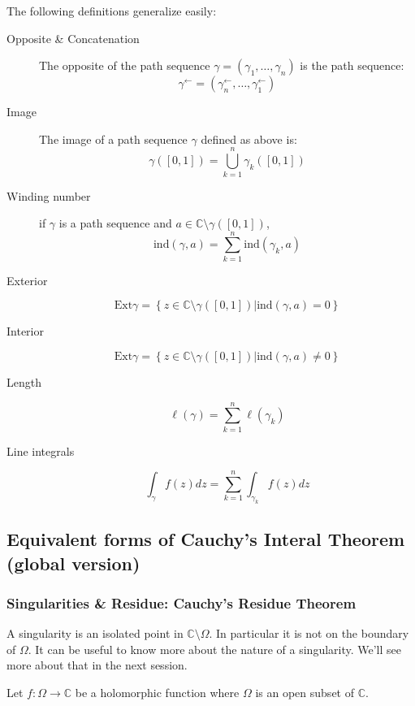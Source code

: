 \begin{enumerate}
\begin{defi}
    The following definitions generalize easily:

    \begin{description}
        \item[Opposite \& Concatenation] The opposite of the path sequence $\gamma = (\gamma_1, \dots, \gamma_n)$ is the path sequence:
            $$\gamma^\leftarrow  = (\gamma_n^\leftarrow, \dots, \gamma_1^\leftarrow)$$
        \item[Image] The image of a path sequence $\gamma$ defined as above is:
            $$ \gamma([0,1]) = \bigcup_{k=1}^n{\gamma_k([0,1])} $$
        \item[Winding number] if $\gamma$ is a path sequence and $a\in\mathbb{C}\setminus\gamma([0,1])$,
            $$\mathrm{ind}(\gamma, a) = \sum_{k=1}^n\mathrm{ind}(\gamma_k, a)$$

        \item[Exterior] 
            $$\mathrm{Ext}\gamma = \left\lbrace z\in\mathbb{C}\setminus\gamma([0,1]) \vert \mathrm{ind}(\gamma, a) = 0 \right\rbrace$$
        \item[Interior] 
            $$\mathrm{Ext}\gamma = \left\lbrace z\in\mathbb{C}\setminus\gamma([0,1]) \vert \mathrm{ind}(\gamma, a) \neq 0 \right\rbrace$$
        \item[Length] 
            $$\ell(\gamma) = \sum_{k=1}^n \ell(\gamma_k)$$
        \item[Line integrals]
            $$\int_\gamma f(z)dz = \sum_{k=1}^n \int_{\gamma_k}f(z)dz$$
    \end{description}
\end{defi}

\subsection{Equivalent forms of Cauchy's Interal Theorem (global version)}


\subsubsection{Singularities \& Residue: Cauchy's Residue Theorem}

A singularity is an isolated point in $\mathbb{C}\setminus\Omega$. In particular it is not on the boundary of $\Omega$. It can be useful to know more about the nature of a singularity. We'll see more about that in the next session.

\begin{defi}[Singularity]
    Let $f: \Omega \rightarrow \mathbb{C}$ be a holomorphic function where $\Omega$ is an open subset of $\mathbb{C}$.
    

\end{defi}
\end{enumerate}
